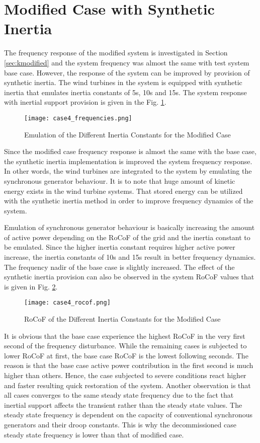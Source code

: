 \section{Modified Case with Synthetic Inertia}
The frequency response of the modified system is investigated in Section \ref{sec:kmodified} and the system frequency was almost the same with test system base case. However, the response of the system can be improved by provision of synthetic inertia. The wind turbines in the system is equipped with synthetic inertia that emulates inertia constants of 5s, 10s and 15s. The system response with inertial support provision is given in the Fig. \ref{Case4_freq}.\par
\begin{figure}[h!]
	\centering
	\texttt{[image: case4\_frequencies.png]}
	\caption{Emulation of the Different Inertia Constants for the Modified Case}
	\label{Case4_freq}
\end{figure}
Since the modified case frequency response is almost the same with the base case, the synthetic inertia implementation is improved the system frequency response. In other words, the wind turbines are integrated to the system by emulating the synchronous generator behaviour. It is to note that huge amount of kinetic energy exists in the wind turbine systems. That stored energy can be utilized with the synthetic inertia method in order to improve frequency dynamics of the system.\par
Emulation of synchronous generator behaviour is basically increasing the amount of active power depending on the RoCoF of the grid and the inertia constant to be emulated. Since the higher inertia constant requires higher active power increase, the inertia constants of 10s and 15s result in better frequency dynamics. The frequency nadir of the base case is slightly increased. The effect of the synthetic inertia provision can also be observed in the system RoCoF values that is given in Fig. \ref{Case4_rocof}.\par
\begin{figure}[h]
	\centering
	\texttt{[image: case4\_rocof.png]}
	\caption{RoCoF of the Different Inertia Constants for the Modified Case}
	\label{Case4_rocof}
\end{figure}
It is obvious that the base case experience the highest RoCoF in the very first second of the frequency disturbance. While the remaining cases is subjected to lower RoCoF at first, the base case RoCoF is the lowest following seconds. The reason is that the base case active power contribution in the first second is much higher than others. Hence, the case subjected to severe conditions react higher and faster resulting quick restoration of the system. Another observation is that all cases converges to the same steady state frequency due to the fact that inertial support affects the transient rather than the steady state values. The steady state frequency is dependent on the capacity of conventional synchronous generators and their droop constants. This is why the decommissioned case steady state frequency is lower than that of modified case.
